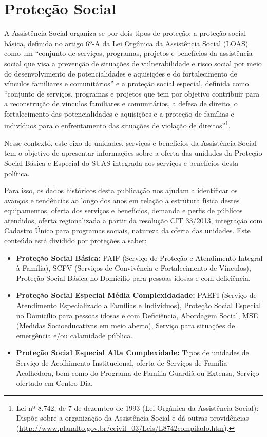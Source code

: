 \documentclass[
  brazilian]{report}
\begin{document}
\hypertarget{proteuxe7uxe3o-social}{%
\section{Proteção Social}\label{proteuxe7uxe3o-social}}

A Assistência Social organiza-se por dois tipos de proteção: a proteção
social básica, definida no artigo 6º-A da Lei Orgânica da Assistência
Social (LOAS) como um ``conjunto de serviços, programas, projetos e
benefícios da assistência social que visa a prevenção de situações de
vulnerabilidade e risco social por meio do desenvolvimento de
potencialidades e aquisições e do fortalecimento de vínculos familiares
e comunitários'' e a proteção social especial, definida como ``conjunto
de serviços, programas e projetos que tem por objetivo contribuir para a
reconstrução de vínculos familiares e comunitários, a defesa de direito,
o fortalecimento das potencialidades e aquisições e a proteção de
famílias e indivíduos para o enfrentamento das situações de violação de
direitos''\footnote{Lei nº 8.742, de 7 de dezembro de 1993 (Lei Orgânica da Assistência Social): Dispõe sobre a organização da Assistência Social e dá outras providências (\url{http://www.planalto.gov.br/ccivil_03/Leis/L8742compilado.htm}).}.

Nesse contexto, este eixo de unidades, serviços e benefícíos da
Assistência Social tem o objetivo de apresentar informações sobre a
oferta das unidades da Proteção Social Básica e Especial do SUAS
integrada aos serviços e benefícios desta política.

Para isso, os dados históricos desta publicação nos ajudam a identificar
os avanços e tendências ao longo dos anos em relação a estrutura física
destes equipamentos, oferta dos serviços e benefícios, demanda e perfis
de públicos atendidos, oferta regionalizada a partir da resolução CIT
33/2013, integração com Cadastro Único para programas sociais, natureza
da oferta das unidades. Este conteúdo está dividido por proteções a
saber:

\begin{itemize}
\item
  \textbf{Proteção Social Básica:} PAIF (Serviço de Proteção e
  Atendimento Integral à Família), SCFV (Serviços de Convivência e
  Fortalecimento de Vínculos), Proteção Social Básica no Domicílio para
  pessoas idosas e com deficiência,
\item
  \textbf{Proteção Social Especial Média Complexidadade:} PAEFI (Serviço
  de Atendimento Especializado a Famílias e Indivíduos), Proteção Social
  Especial no Domicílio para pessoas idosas e com Deficiência, Abordagem
  Social, MSE (Medidas Socioeducativas em meio aberto), Serviço para
  situações de emergência e/ou calamidade pública.
\item
  \textbf{Proteção Social Especial Alta Complexidade:} Tipos de unidades
  de Serviço de Acolhimento Institucional, oferta de Serviços de Família
  Acolhedora, bem como do Programa de Família Guardiã ou Extensa,
  Serviço ofertado em Centro Dia.
\end{itemize}
\end{document}
